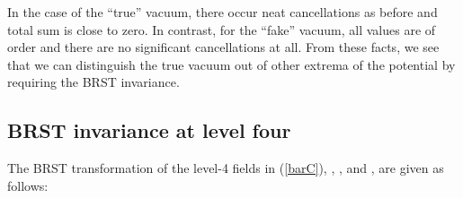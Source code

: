 \documentclass[a4paper,12pt]{article}
\begin{document}
In the case of the ``true'' vacuum, there occur neat cancellations as
before and total sum is close to zero.
In contrast, for the ``fake'' vacuum, all values are of order \coordHE{}
and there are no significant cancellations at all.
{}From these facts, we see that we can distinguish the true vacuum out
of other extrema of the potential by requiring the BRST invariance.

\subsection{BRST invariance at level four}
\label{sec:level4}

The BRST transformation of the level-4 fields in (\ref{barC}),
\coordHE{}, \coordHE{}, \coordHE{} and \coordHE{},
are given as follows:
\end{document}
